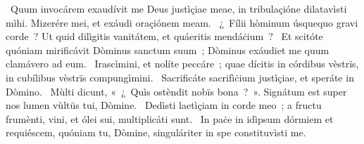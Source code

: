 ~Quum invocárem exaudívit me Deus justìçiae meae, in tribulaçióne dilatavìsti mìhi. Mizerére mei, et exáudi oraçiónem meam. 
~¿~Fílii hòminum úsquequo gravi corde~? Ut quid dilìgitis vanitátem, et quáeritis mendáċium~? 
~Et scitóte quóniam mirificávit Dòminus sanctum suum~; Dòminus exáudiet me quum clamávero ad eum. 
~Irascìmini, et nolíte peccáre~; quae dícitis in córdibus vèstrïs, in cubílibus vèstrïs compungìmini. 
~Sacrificáte sacrifìċium justìçiae, et speráte in Dòmino. 
~Mùlti dicunt, «~¿~Quìs ostèndit nobïs bona~?~». Signátum est super nos lumen vùltüs tui, Dòmine. 
~Dedìsti laetìçiam in corde meo~; a fructu frumènti, vini, et ólei sui, multiplicáti sunt. 
~In paċe in idìpsum dórmiem et requiéscem, quóniam tu, Dòmine, singuláriter in spe constituvìsti me. 
